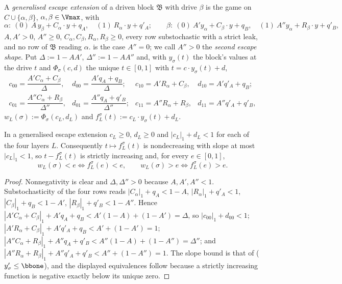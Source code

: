 
\begin{definition}\label{def:ec-escape2}
A \emph{generalised escape extension} of a driven block $\mathfrak B$ with drive $\beta$ is the
game on $C\cup\{\alpha,\beta\}$, $\alpha,\beta\in\Vmax$, with
\[
 \alpha:\ (0)\ A\,y_\beta+C_\alpha\!\cdot\!y+q_A,\quad(1)\ R_\alpha\!\cdot\!y+q'_A;
 \qquad
 \beta:\ (0)\ A'y_\alpha+C_\beta\!\cdot\!y+q_B,\quad(1)\ A''y_\alpha+R_\beta\!\cdot\!y+q'_B,
\]
$A,A'>0$, $A''\ge0$, $C_\alpha,C_\beta,R_\alpha,R_\beta\ge0$, every row substochastic with a
strict leak, and no row of $\mathfrak B$ reading $\alpha$.  is the case
$A''=0$; we call $A''>0$ the \emph{second escape shape}. Put $\Delta:=1-AA'$,
$\Delta'':=1-AA''$ and, with $y_\sigma(t)$ the block's values at the drive $t$ and
$\Phi_\sigma(c,d)$ the unique $t\in[0,1]$ with $t=c\cdot y_\sigma(t)+d$,
\[
\begin{array}{llll}
 c_{00}=\dfrac{A'C_\alpha+C_\beta}{\Delta}, & d_{00}=\dfrac{A'q_A+q_B}{\Delta}; &
 c_{10}=A'R_\alpha+C_\beta, & d_{10}=A'q'_A+q_B;\\[2mm]
 c_{01}=\dfrac{A''C_\alpha+R_\beta}{\Delta''}, & d_{01}=\dfrac{A''q_A+q'_B}{\Delta''}; &
 c_{11}=A''R_\alpha+R_\beta, & d_{11}=A''q'_A+q'_B,
\end{array}
\]
$w_L(\sigma):=\Phi_\sigma(c_L,d_L)$ and $f^\sigma_L(t):=c_L\cdot y_\sigma(t)+d_L$.
\end{definition}

\begin{lemma}\label{lem:ec-substochastic}
In a generalised escape extension $c_L\ge0$, $d_L\ge0$ and $|c_L|_1+d_L<1$ for each of the four
layers $L$. Consequently $t\mapsto f^\sigma_L(t)$ is nondecreasing with slope at most
$|c_L|_1<1$, so $t-f^\sigma_L(t)$ is strictly increasing and, for every $e\in[0,1]$,
\[
 w_L(\sigma)<e\iff f^\sigma_L(e)<e,\qquad w_L(\sigma)>e\iff f^\sigma_L(e)>e .
\]
\end{lemma}

\begin{proof}
Nonnegativity is clear and $\Delta,\Delta''>0$ because $A,A',A''<1$. Substochasticity of the four
rows reads $|C_\alpha|_1+q_A<1-A$, $|R_\alpha|_1+q'_A<1$, $|C_\beta|_1+q_B<1-A'$,
$|R_\beta|_1+q'_B<1-A''$. Hence
$|A'C_\alpha+C_\beta|_1+A'q_A+q_B<A'(1-A)+(1-A')=\Delta$, so $|c_{00}|_1+d_{00}<1$;
$|A'R_\alpha+C_\beta|_1+A'q'_A+q_B<A'+(1-A')=1$;
$|A''C_\alpha+R_\beta|_1+A''q_A+q'_B<A''(1-A)+(1-A'')=\Delta''$; and
$|A''R_\alpha+R_\beta|_1+A''q'_A+q'_B<A''+(1-A'')=1$. The slope bound is that of
 ($y'_\sigma\le\bbone$), and the displayed equivalences follow because a
strictly increasing function is negative exactly below its unique zero.
\end{proof}


